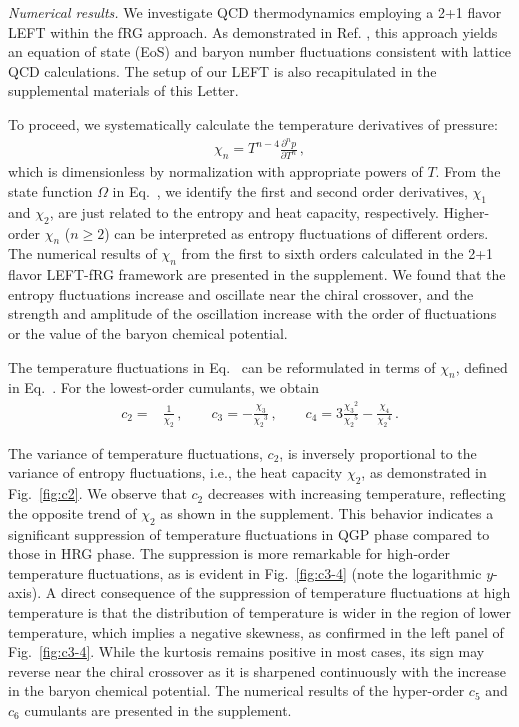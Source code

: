 \documentclass[aps,twocolumn,
prl,
superscriptaddress,nofootinbib,floatfix]{revtex4-2}
\begin{document}

\textit{Numerical results.}\label{sec:numerical} We investigate QCD thermodynamics employing a 2+1 flavor LEFT within the fRG approach. As demonstrated in Ref. \cite{Wen:2018nkn}, this approach yields an equation of state (EoS) and baryon number fluctuations consistent with lattice QCD calculations. The setup of our LEFT is also recapitulated in the supplemental materials of this Letter.

To proceed, we systematically calculate the temperature derivatives of pressure: 
\begin{align}
    \chi_n=T^{n-4}\frac{\partial^n p}{\partial T^n}\,, \label{eq:chi}
\end{align}
which is dimensionless by normalization with appropriate powers of $T$. From the state function $\Omega$ in Eq.~, we identify the first and second order derivatives, $\chi_1$ and $\chi_2$, are just related to the entropy and heat capacity, respectively. Higher-order $\chi_n$ ($n \geq 2$) can be interpreted as entropy fluctuations of different orders. The numerical results of $\chi_n$ from the first to sixth orders calculated in the 2+1 flavor LEFT-fRG framework are presented in the supplement. We found that the entropy fluctuations increase and oscillate near the chiral crossover, and the strength and amplitude of the oscillation increase with the order of fluctuations or the value of the baryon chemical potential. 

The temperature fluctuations in Eq.~ can be reformulated in terms of $\chi_n$, defined in Eq.~. For the lowest-order cumulants, we obtain
\begin{align}
    c_2=&\frac{1}{\chi_2}\,, \qquad c_3=-\frac{\chi_3}{{\chi_2}^3}\,, \qquad c_4=3\frac{{\chi_3}^2}{{\chi_2}^5}-\frac{\chi_4}{{\chi_2}^4}\,. \label{}
\end{align}

The variance of temperature fluctuations, $c_2$, is inversely proportional to the variance of entropy fluctuations, i.e., the heat capacity $\chi_2$, as demonstrated in Fig.~\ref{fig:c2}. We observe that $c_2$ decreases with increasing temperature, reflecting the opposite trend of $\chi_2$ as shown in the supplement. This behavior indicates a significant suppression of temperature fluctuations in QGP phase compared to those in HRG phase. The suppression is more remarkable for high-order temperature fluctuations, as is evident in Fig.~\ref{fig:c3-4} 
(note the logarithmic $y$-axis). A direct consequence of the suppression of temperature fluctuations at high temperature is that the distribution of temperature is wider in the region of lower temperature, which implies a negative skewness, as confirmed in the left panel of Fig.~\ref{fig:c3-4}. While the kurtosis remains positive in most cases, its sign may reverse near the chiral crossover as it is sharpened continuously with the increase in the baryon chemical potential. The numerical results of the hyper-order $c_5$ and $c_6$ cumulants are presented in the supplement.
\end{document}
